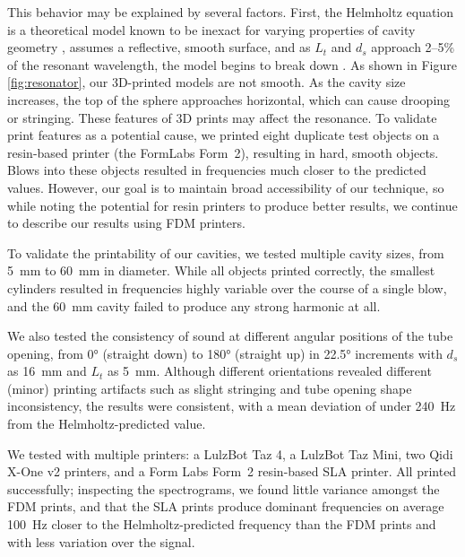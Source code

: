       This behavior may be explained by several factors. First, the Helmholtz
      equation is a theoretical model known to be inexact for varying properties
      of cavity geometry \cite{Selamet:1995kv, Alster:1972ha}, assumes a
      reflective, smooth surface, and  as $L_t$ and $d_s$ approach 2--5\% of the
      resonant wavelength, the model begins to break down \cite{Selamet:1995kv}.
      As shown in Figure \ref{fig:resonator}, our 3D-printed models are not
      smooth. As the cavity size increases, the top of the sphere approaches
      horizontal, which can cause drooping or stringing. These features of 3D
      prints may affect the resonance. To validate print features as a potential
      cause, we printed eight duplicate test objects on a resin-based printer
      (the FormLabs Form~2), resulting in hard, smooth objects. Blows into these
      objects resulted in frequencies much closer to the predicted values.
      However, our goal is to maintain broad accessibility of our technique, so
      while noting the potential for resin printers to produce better results,
      we continue to describe our results using FDM printers.
      
      To validate the printability of our cavities, we tested multiple cavity
      sizes, from 5~mm to 60~mm in diameter. While all objects printed
      correctly, the smallest cylinders resulted in frequencies highly variable
      over the course of a single blow, and the 60~mm cavity failed to produce
      any strong harmonic at all.
      
      We also tested the consistency of sound at different angular positions of
      the tube opening, from 0° (straight down) to 180° (straight up) in 22.5°
      increments with $d_s$ as 16~mm and $L_t$ as 5~mm.  Although different
      orientations revealed different (minor) printing artifacts such as slight
      stringing and tube opening shape inconsistency, the results were
      consistent, with a mean deviation of under 240~Hz from the
      Helmholtz-predicted value.
      
      We tested \bh with multiple printers: a LulzBot Taz 4, a LulzBot Taz Mini,
      two Qidi X-One v2 printers, and a Form Labs Form~2 resin-based SLA
      printer. All printed successfully; inspecting the spectrograms, we found
      little variance amongst the FDM prints, and that the SLA prints produce
      dominant frequencies on average 100~Hz closer to the Helmholtz-predicted
      frequency than the FDM prints and with less variation over the signal.

